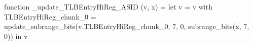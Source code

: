function _update_TLBEntryHiReg_ASID (v, x) = let v = { v with TLBEntryHiReg_chunk_0 = update_subrange_bits(v.TLBEntryHiReg_chunk_0, 7, 0, subrange_bits(x, 7, 0)) } in
  v
